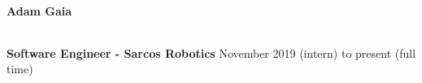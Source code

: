 \documentclass{article}
\begin{document}
\begin{center}
{\huge\textbf{Adam Gaia}}
\end{center}

\begin{center}
\begin{tabular}{ c c c }

\end{tabular}
\end{center}


\textbf{Software Engineer - Sarcos Robotics} \hfill  November 2019 (intern) to present (full time)
\end{document}
